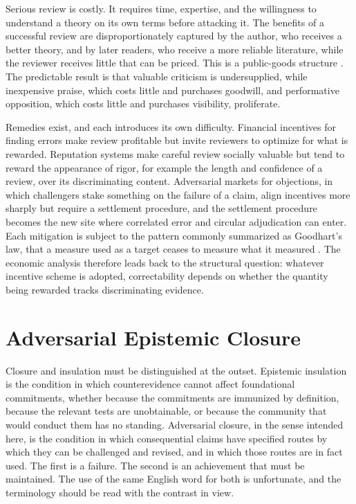 \documentclass[11pt]{article}
\theoremstyle{remark}
\begin{document}
Serious review is costly. It requires time, expertise, and the willingness to understand a theory on its own terms before attacking it. The benefits of a successful review are disproportionately captured by the author, who receives a better theory, and by later readers, who receive a more reliable literature, while the reviewer receives little that can be priced. This is a public-goods structure \cite{kitcher1990}. The predictable result is that valuable criticism is undersupplied, while inexpensive praise, which costs little and purchases goodwill, and performative opposition, which costs little and purchases visibility, proliferate.

Remedies exist, and each introduces its own difficulty. Financial incentives for finding errors make review profitable but invite reviewers to optimize for what is rewarded. Reputation systems make careful review socially valuable but tend to reward the appearance of rigor, for example the length and confidence of a review, over its discriminating content. Adversarial markets for objections, in which challengers stake something on the failure of a claim, align incentives more sharply but require a settlement procedure, and the settlement procedure becomes the new site where correlated error and circular adjudication can enter. Each mitigation is subject to the pattern commonly summarized as Goodhart's law, that a measure used as a target ceases to measure what it measured \cite{goodhart1984,strathern1997}. The economic analysis therefore leads back to the structural question: whatever incentive scheme is adopted, correctability depends on whether the quantity being rewarded tracks discriminating evidence.

\section{Adversarial Epistemic Closure}
\label{sec:closure}

Closure and insulation must be distinguished at the outset. Epistemic insulation is the condition in which counterevidence cannot affect foundational commitments, whether because the commitments are immunized by definition, because the relevant tests are unobtainable, or because the community that would conduct them has no standing. Adversarial closure, in the sense intended here, is the condition in which consequential claims have specified routes by which they can be challenged and revised, and in which those routes are in fact used. The first is a failure. The second is an achievement that must be maintained. The use of the same English word for both is unfortunate, and the terminology should be read with the contrast in view.
\end{document}

